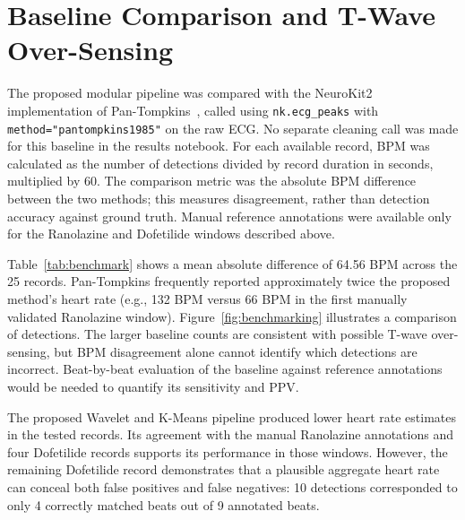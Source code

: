 \documentclass[11pt]{article}
\begin{document}
\section{Baseline Comparison and T-Wave Over-Sensing}\label{sec:benchmark}
The proposed modular pipeline was compared with the NeuroKit2 implementation of Pan-Tompkins~\cite{pan_real-time_1985, neurokit2_ecg_peaks}, called using \texttt{nk.ecg\_peaks} with \texttt{method="pantompkins1985"} on the raw ECG. No separate cleaning call was made for this baseline in the results notebook. For each available record, BPM was calculated as the number of detections divided by record duration in seconds, multiplied by 60. The comparison metric was the absolute BPM difference between the two methods; this measures disagreement, rather than detection accuracy against ground truth. Manual reference annotations were available only for the Ranolazine and Dofetilide windows described above.

Table~\ref{tab:benchmark} shows a mean absolute difference of 64.56 BPM across the 25 records. Pan-Tompkins frequently reported approximately twice the proposed method's heart rate (e.g., 132 BPM versus 66 BPM in the first manually validated Ranolazine window). Figure~\ref{fig:benchmarking} illustrates a comparison of detections. The larger baseline counts are consistent with possible T-wave over-sensing, but BPM disagreement alone cannot identify which detections are incorrect. Beat-by-beat evaluation of the baseline against reference annotations would be needed to quantify its sensitivity and PPV.

The proposed Wavelet and K-Means pipeline produced lower heart rate estimates in the tested records. Its agreement with the manual Ranolazine annotations and four Dofetilide records supports its performance in those windows. However, the remaining Dofetilide record demonstrates that a plausible aggregate heart rate can conceal both false positives and false negatives: 10 detections corresponded to only 4 correctly matched beats out of 9 annotated beats.
\end{document}

